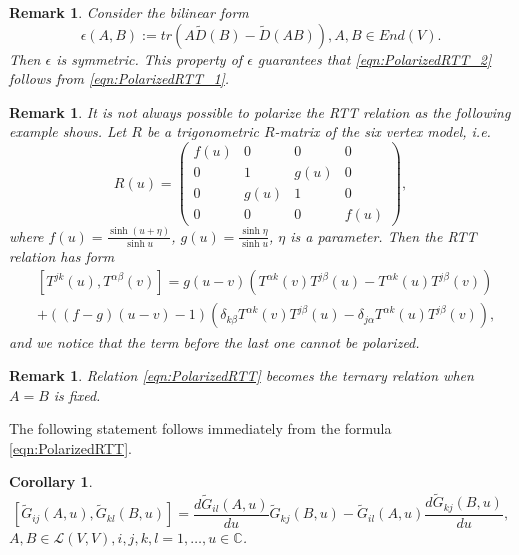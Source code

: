 \documentclass[10pt]{article}%
\numberwithin{equation}{section}
\newtheorem{cor}[thm]{Corollary}
\newtheorem{rem}[thm]{Remark}
\begin{document}
\begin{rem}\label{rem:Polarization}
Consider the bilinear form 
\begin{equation}\label{eqn:Def_Epsilon}
\epsilon (A,B):=tr (A\widetilde{D}(B)-\widetilde{D}(AB)), A,B\in End(V).   
\end{equation}
Then $\epsilon$ is symmetric. This property of 
 $\epsilon$ guarantees that 
   \eqref{eqn:PolarizedRTT_2} follows from \eqref{eqn:PolarizedRTT_1}.
 
\end{rem}

\begin{rem}\label{rem:RTTGeneralization}
It is not always possible to polarize the RTT relation as the following example shows. Let $R$ be a trigonometric $R$-matrix of the six vertex model, i.e.
\[
R(u)=\left(
\begin{array}{cccc}
f(u) & 0 & 0 & 0\\
0 & 1 & g(u) & 0\\
0 & g(u) & 1 & 0\\
0 & 0 & 0 & f(u)
\end{array}
\right),
\]
where $f(u)=\frac{\sinh(u+\eta)}{\sinh u}$, $g(u)=\frac{\sinh\eta}{\sinh u}$, $\eta$ is a parameter. Then the RTT relation has  form
\begin{eqnarray}
&[T^{jk}(u),T^{\alpha\beta}(v)]=g(u-v)\left(T^{\alpha k}(v)T^{j\beta}(u)-T^{\alpha k}(u)T^{j\beta}(v)\right)\nonumber\\
&+((f-g)(u-v)-1)\left(\delta_{k\beta}T^{\alpha k}(v)T^{j\beta}(u)-\delta_{j\alpha}T^{\alpha k}(u)T^{j\beta}(v)\right),
\end{eqnarray}
and we  notice that the term before the last one cannot be polarized.
\end{rem}

\begin{rem}
Relation \eqref{eqn:PolarizedRTT} becomes the ternary relation when $A=B$ is fixed.
\end{rem}

The following statement follows immediately from the formula \eqref{eqn:PolarizedRTT}.
\begin{cor}
\begin{equation}\label{eqn:PolarizedRTTpp}
[\widetilde{G}_{ij}(A,u),\widetilde{G}_{kl}(B,u)]=\frac{d\widetilde{G}_{il}(A,u)}{du}\widetilde{G}_{kj}(B,u)-\widetilde{G}_{il}(A,u)\frac{d\widetilde{G}_{kj}(B,u)}{du},
\end{equation}
$A,B\in\mathcal{L}(V,V),i,j,k,l=1,\ldots,u\in\mathbb{C}$.
\end{cor}
\end{document}
